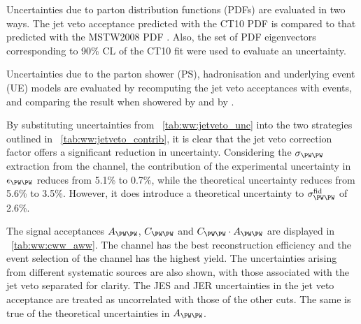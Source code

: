 Uncertainties due to parton distribution functions (PDFs) are evaluated in two ways. The 
jet veto acceptance predicted with the CT10 PDF is compared to that predicted with the 
MSTW2008 PDF \cite{MSTW}. Also, the set of PDF eigenvectors corresponding to 90\% CL of 
the CT10 fit were used to evaluate an uncertainty.

Uncertainties due to the parton shower (PS), hadronisation and underlying event (UE) 
models are evaluated by recomputing the jet veto acceptances with \powhegbox events, and 
comparing the result when showered by \fherwig and by .

By substituting uncertainties from \Table~\ref{tab:ww:jetveto_unc} into the two 
strategies outlined in \Table~\ref{tab:ww:jetveto_contrib}, it is clear that the jet veto 
correction factor offers a significant reduction in uncertainty. Considering the 
$\sigma_{\WW}$ extraction from the \emch channel, the contribution of the experimental 
uncertainty in $\epsilon_{\WW}$ reduces from 5.1\% to 0.7\%, while the theoretical 
uncertainty reduces from 5.6\% to 3.5\%. However, it does introduce a theoretical 
uncertainty to $\sigma^{\text{fid}}_{\WW}$ of 2.6\%.

The signal acceptances $A_{\WW}$, $C_{\WW}$ and $C_{\WW} \cdot A_{\WW}$ are displayed in 
\Table~\ref{tab:ww:cww_aww}. The \mmch channel has the best reconstruction efficiency and 
the event selection of the \emch channel has the highest yield. The uncertainties arising 
from different systematic sources are also shown, with those associated with the jet veto 
separated for clarity. The JES and JER uncertainties in the jet veto acceptance 
are treated as uncorrelated with those of the other cuts. The same is true of the 
theoretical uncertainties in $A_{\WW}$. 

